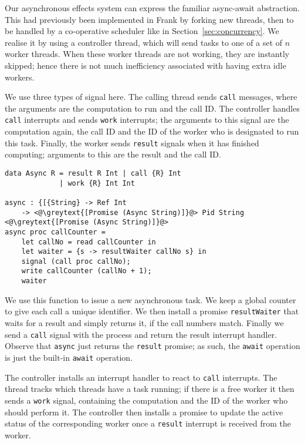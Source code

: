 \documentclass[msc,deptreport,cs]{infthesis} %
\newcommand{\code}[1]{\lstinline{#1}}
\newcommand{\greytext}[1]{\textcolor{black!40}{#1}}
\newcommand{\todo}[1]
           {{\par\noindent\small\color{RoyalPurple}
  \framebox{\parbox{\dimexpr\linewidth-2\fboxsep-2\fboxrule}
    {\textbf{TODO:} #1}}}}
\begin{document}
Our asynchronous effects system can express the familiar async-await
abstraction. This had previously been implemented in Frank by forking new
threads, then to be handled by a co-operative scheduler like in
Section~\ref{sec:concurrency}. We realise it by using a controller thread, which
will send tasks to one of a set of $n$ worker threads. When these worker threads
are not working, they are instantly skipped; hence there is not much
inefficiency associated with having extra idle workers.

We use three types of signal here. The calling thread sends \code{call}
messages, where the arguments are the computation to run and the call ID. The
controller handles \code{call} interrupts and sends \code{work} interrupts; the
arguments to this signal are the computation again, the call ID and the ID of
the worker who is designated to run this task. Finally, the worker sends
\code{result} signals when it has finished computing; arguments to this are the
result and the call ID.




\begin{lstlisting}
data Async R = result R Int | call {R} Int
             | work {R} Int Int

async : {[{String} -> Ref Int
    -> <@\greytext{[Promise (Async String)]}@> Pid String <@\greytext{[Promise (Async String)]}@>
async proc callCounter =
    let callNo = read callCounter in
    let waiter = {s -> resultWaiter callNo s} in
    signal (call proc callNo);
    write callCounter (callNo + 1);
    waiter
\end{lstlisting}

We use this function to issue a new asynchronous task. We keep a global counter
to give each call a unique identifier. We then install a promise
\code{resultWaiter} that waits for a result and simply returns it, if the call
numbers match. Finally we send a \code{call} signal with the process and return
the result interrupt handler. Observe that \code{async} just returns the
\code{result} promise; as such, the \code{await} operation is just the built-in
\code{await} operation.

The controller installs an interrupt handler to react to \code{call} interrupts.
The thread tracks which threads have a task running; if there is a free worker
it then sends a \code{work} signal, containing the computation and the ID of the
worker who should perform it. The controller then installs a promise to update
the active status of the corresponding worker once a \code{result} interrupt is
received from the worker.
\end{document}
